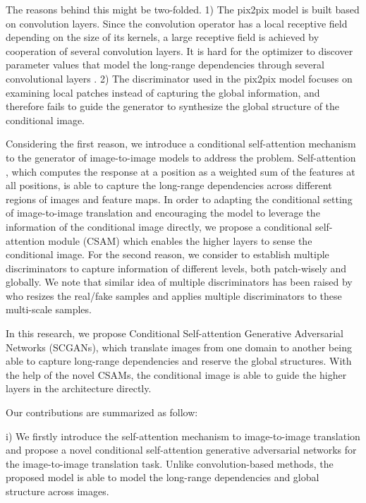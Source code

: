 The reasons behind this might be two-folded.
%
1) The pix2pix model is built based on convolution layers. Since the convolution operator has a local receptive field depending on the size of its kernels, a large receptive field is achieved by cooperation of several convolution layers. It is hard for the optimizer to discover parameter values that model the long-range dependencies through several convolutional layers \cite{SAGANs}. 
2) The discriminator used in the pix2pix model \cite{pix2pix} focuses on examining local patches instead of capturing the global information, and therefore fails to guide the generator to synthesize the global structure of the conditional image. 

Considering the first reason, we introduce a conditional self-attention mechanism to the generator of image-to-image models to address the problem.
Self-attention \cite{Non-local, Attention, MachineReading, SAGANs}, which computes the response at a position as a weighted sum of the features at all positions, is able to capture the long-range dependencies across different regions of images and feature maps. In order to adapting the conditional setting of image-to-image translation and encouraging the model to leverage the information of the conditional image directly, we propose a conditional self-attention module (CSAM) which enables the higher layers to sense the conditional image. 
%
For the second reason, we consider to establish multiple discriminators to capture information of different levels, both patch-wisely and globally. We note that similar idea of multiple discriminators has been raised by \cite{LaplaceGANs, SGANs, StackGANs, CRN} who resizes the real/fake samples and applies multiple discriminators to these multi-scale samples. 

In this research, we propose Conditional Self-attention Generative Adversarial Networks (SCGANs), which translate images from one domain to another being able to capture long-range dependencies and reserve the global structures. With the help of the novel CSAMs, the conditional image is able to guide the higher layers in the architecture directly.  

Our contributions are summarized as follow:

i) We firstly introduce the self-attention mechanism to image-to-image translation and propose a novel conditional self-attention generative adversarial networks for the image-to-image translation task. Unlike convolution-based methods, the proposed model is able to model the long-range dependencies and global structure across images.

